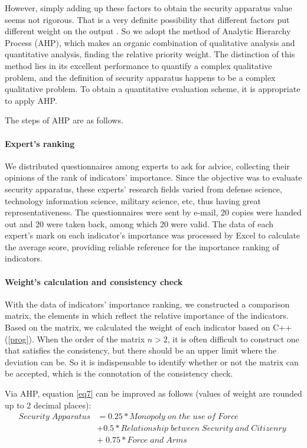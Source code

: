 \documentclass[a4paper,12pt]{article}
\begin{document}
However, simply adding up these factors to obtain the security apparatus value seems not rigorous. That is a very definite possibility that different factors put different weight on the output \citep{saaty2008decision}. So we adopt the method of Analytic Hierarchy Process (AHP), which makes an organic combination of qualitative analysis and quantitative analysis, finding the relative priority weight. The distinction of this method lies in its excellent performance to quantify a complex qualitative problem, and the definition of security apparatus happens to be a complex qualitative problem. To obtain a quantitative evaluation scheme, it is appropriate to apply AHP.

The steps of AHP are as follows.

\paragraph{Expert's ranking} We distributed questionnaires among experts to ask for advice, collecting their opinions of the rank of indicators' importance. Since the objective was to evaluate security apparatus, these experts' research fields varied from defense science, technology information science, military science, etc, thus having great representativeness. The questionnaires were sent by e-mail, 20 copies were handed out and 20 were taken back, among which 20 were valid. The data of each expert's mark on each indicator's importance was processed by Excel to calculate the average score, providing reliable reference for the importance ranking of indicators. 

\paragraph{Weight's calculation and consistency check} With the data of indicators' importance ranking, we constructed a comparison matrix, the elements in which reflect the relative importance of the indicators. Based on the matrix, we calculated the weight of each indicator based on C++ (\ref{prog}). When the order of the matrix $n>2$, it is often difficult to construct one that satisfies the consistency, but there should be an upper limit where the deviation can be. So it is indispensable to identify whether or not the matrix can be accepted, which is the connotation of the consistency check.


Via AHP, equation \eqref{eq7} can be improved as follows (values of weight are rounded up to 2 decimal places):
\begin{equation}
\begin{split}
Security\;Apparatus&=0.25*Monopoly\;on\;the\;use\;of\;Force\\&+0.5*Relationship\;between\;Security\;and\;Citizenry\;\\ &+\;0.75*Force\;and\;Arms
\end{split}
\end{equation}
\end{document}

